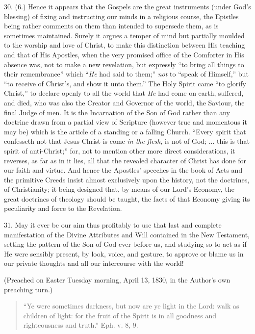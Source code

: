 30. (6.) Hence it appears that the Gospels are the great
instruments (under God's blessing) of fixing and instructing our minds
in a religious course, the Epistles being rather comments on them than
intended to supersede them, as is sometimes maintained. Surely it
argues a temper of mind but partially moulded to the worship and love
of Christ, to make this distinction between His teaching and that of
His Apostles, when the very promised office of the Comforter in His
absence was, not to make a new revelation, but expressly ``to
bring all things to their remembrance'' which ``\emph{He} had
said to them;'' \emph{not} to ``speak of Himself,'' but
``to receive of Christ's, and show it unto them.'' The Holy
Spirit came ``to glorify Christ,'' to declare openly to all
the world that \emph{He} had come on earth, suffered, and died, who
was also the Creator and Governor of the world, the Saviour, the final
Judge of men. It is the Incarnation of the Son of God rather than any
doctrine drawn from a partial view of Scripture (however true and
momentous it may be) which is the article of a standing or a falling
Church. ``Every spirit that confesseth not that Jesus Christ is
come \emph{in the flesh}, is not of God; ... this is that spirit of
anti-Christ;'' for, not to mention other more direct
considerations, it reverses, as far as in it lies, all that the
revealed character of Christ has done for our faith and virtue. And
hence the Apostles' speeches in the book of Acts and the primitive
Creeds insist almost exclusively upon the history, not the doctrines,
of Christianity; it being designed that, by means of our Lord's
Economy, the great doctrines of theology should be taught, the facts
of that Economy giving its peculiarity and force to the Revelation.

31. May it ever be our aim thus profitably to use that last and
complete manifestation of the Divine Attributes and Will contained in
the New Testament, setting the pattern of the Son of God ever before
us, and studying so to act as if He were sensibly present, by look,
voice, and gesture, to approve or blame us in our private thoughts and
all our intercourse with the world!

(Preached on Easter Tuesday morning, April 13, 1830, in the
Author's own preaching turn.)


\begin{quote}

``Ye were sometimes darkness, but now are ye light in the
Lord: walk as children of light: for the fruit of the Spirit is in
all goodness and righteousness and truth.'' Eph. v. 8, 9.

\end{quote}

